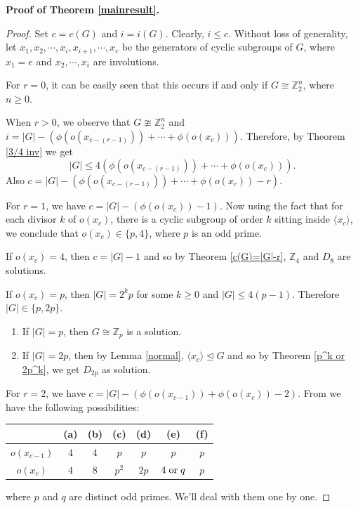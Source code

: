 \documentclass[a4paper,11pt]{amsart}
\numberwithin{equation}{section}
\numberwithin{equation}{subsection}
\begin{document}
 



\textbf{Proof of Theorem \ref{mainresult}.}
\begin{proof} Set $c=c(G)$ and $i=i(G)$. Clearly, $i\leq c$. Without loss of generality, let $x_1,x_2,\cdots,x_i,x_{i+1},\cdots,x_c$ be the generators of cyclic subgroups of $G$, where $x_1=e$ and $x_2,\cdots,x_i$ are involutions.


For $r=0$, it can be easily seen that this occurs if and only if $G \cong \mathbb{Z}_2^n$, where $n \geq 0$.

When $r>0$, we observe that $G\ncong \mathbb{Z}_2^n$ and $i=|G|-(\phi(o(x_{c-(r-1)}))+\cdots+\phi(o(x_{c})))$. Therefore, by Theorem \ref{3/4 inv} we get $$|G|\leq 4(\phi(o(x_{c-(r-1)}))+\cdots+\phi(o(x_{c}))).$$ Also $c=|G|-(\phi(o(x_{c-(r-1)}))+\cdots+\phi(o(x_{c}))-r)$.

For $r=1$, we have  $c=|G|-(\phi(o(x_{c}))-1)$. Now  using the fact that for each divisor $k$ of $o(x_{c})$, there is a  cyclic subgroup of  order $k$ sitting inside $\langle x_{c}\rangle$, we conclude that $o(x_{c})\in\{ p,4\}$, where $p$ is an odd prime.

If $o(x_{c})=4$, then $c=|G|-1 $ and so by Theorem \ref{c(G)=|G|-r}, $\mathbb{Z}_{4}$ and $ D_{8}$ are solutions.

If $o(x_{c})=p$, then  $|G|=2^{k}p$ for some $k\geq 0$ and $|G|\leq 4(p-1)$. Therefore $|G|\in\{p,2p\}$. 
\begin{enumerate}
    \item If $|G|=p$, then $G\cong \mathbb{Z}_{p}$ is a solution.

    \item If $|G|=2p$, then by Lemma \ref{normal}, $\langle x_{c}\rangle \trianglelefteq G$ and so by Theorem \ref{p^k or 2p^k}, we get $D_{2p}$ as solution.
\end{enumerate}
 

For $r=2$, we have $c=|G|-(\phi(o(x_{c-1}))+\phi(o(x_{c}))-2)$. From \cite[Section 3.3.3]{CHS} we have the following possibilities:


\begin{center}
\begin{tabular}{ |c|c|c|c|c|c|c| } 
\hline
&(a) & (b) & (c) & (d) &  (e) & (f) \\
\hline
$o(x_{c-1})$ & $4$ & $4$  & $p$ & $p$ &  $p$& $p$\\ 
$o(x_{c})$ & $4$ & $8$ & $p^2$ & $2p$  & $4 \hspace{1mm}\text{or}\hspace{1mm} q$ & $p$\\ 
\hline
\end{tabular}
\end{center} 
where $p$ and $q$ are distinct odd primes. We'll deal with them one by one.


\end{proof}
\end{document}
